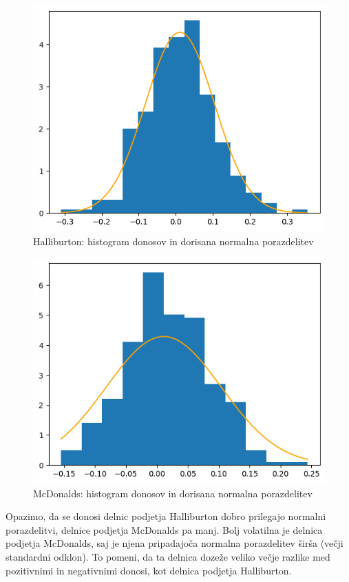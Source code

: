 \documentclass[a4paper,11pt]{article}
\begin{document}
\begin{figure}[H]
    \centering
    \includegraphics[scale = 0.45]{slike1/2_3.png}
    \caption{Halliburton: histogram donosov in dorisana normalna porazdelitev}
\end{figure}

\begin{figure}[H]
    \centering
    \includegraphics[scale = 0.45]{slike1/2_4.png}
    \caption{McDonalds: histogram donosov in dorisana normalna porazdelitev}
\end{figure}

\noindent Opazimo, da se donosi delnic podjetja Halliburton dobro prilegajo normalni porazdelitvi, delnice podjetja McDonalds pa manj. Bolj volatilna je delnica podjetja McDonalds, saj je njena pripadajoča normalna porazdelitev širša (večji standardni odklon). To pomeni, da ta delnica dozeže veliko večje razlike med pozitivnimi in negativnimi donosi, kot delnica podjetja Halliburton.
\newline
\end{document}
